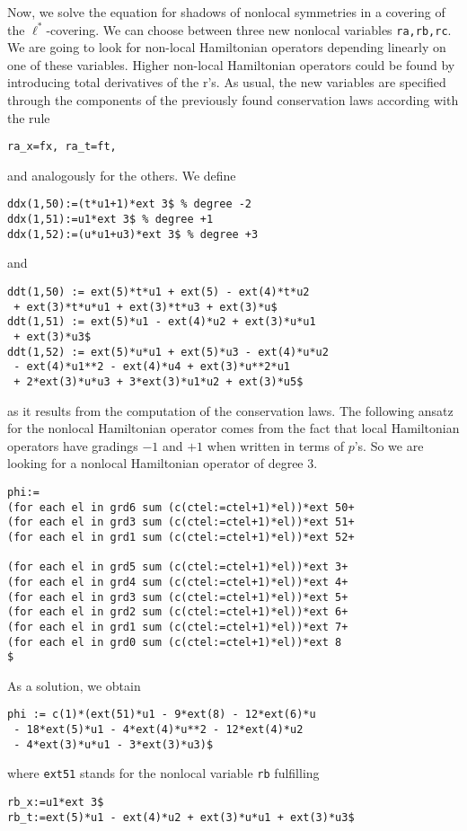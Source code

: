 Now, we solve the equation for shadows of nonlocal symmetries in a covering of
the $\ell^*$-covering. We can choose between three new nonlocal variables
\texttt{ra,rb,rc}. We are going to look for non-local Hamiltonian operators
depending linearly on one of these variables. Higher non-local Hamiltonian 
operators could be found by introducing total derivatives of the r's.
As usual, the new variables are specified through the components of the 
previously found conservation laws according with the rule
\begin{verbatim}
ra_x=fx, ra_t=ft,
\end{verbatim}
and analogously for the others. We define
\begin{verbatim}
ddx(1,50):=(t*u1+1)*ext 3$ % degree -2
ddx(1,51):=u1*ext 3$ % degree +1
ddx(1,52):=(u*u1+u3)*ext 3$ % degree +3
\end{verbatim}
and
\begin{verbatim}
ddt(1,50) := ext(5)*t*u1 + ext(5) - ext(4)*t*u2
 + ext(3)*t*u*u1 + ext(3)*t*u3 + ext(3)*u$
ddt(1,51) := ext(5)*u1 - ext(4)*u2 + ext(3)*u*u1
 + ext(3)*u3$
ddt(1,52) := ext(5)*u*u1 + ext(5)*u3 - ext(4)*u*u2
 - ext(4)*u1**2 - ext(4)*u4 + ext(3)*u**2*u1
 + 2*ext(3)*u*u3 + 3*ext(3)*u1*u2 + ext(3)*u5$
\end{verbatim}
as it results from the computation of the conservation laws.
The following ansatz for the nonlocal Hamiltonian operator
comes from the fact that local Hamiltonian operators have 
gradings $-1$ and $+1$ when written in terms of $p$'s. So we are looking 
for a nonlocal Hamiltonian operator of degree $3$.
\begin{verbatim}
phi:=
(for each el in grd6 sum (c(ctel:=ctel+1)*el))*ext 50+
(for each el in grd3 sum (c(ctel:=ctel+1)*el))*ext 51+
(for each el in grd1 sum (c(ctel:=ctel+1)*el))*ext 52+

(for each el in grd5 sum (c(ctel:=ctel+1)*el))*ext 3+
(for each el in grd4 sum (c(ctel:=ctel+1)*el))*ext 4+
(for each el in grd3 sum (c(ctel:=ctel+1)*el))*ext 5+
(for each el in grd2 sum (c(ctel:=ctel+1)*el))*ext 6+
(for each el in grd1 sum (c(ctel:=ctel+1)*el))*ext 7+
(for each el in grd0 sum (c(ctel:=ctel+1)*el))*ext 8
$
\end{verbatim}
As a solution, we obtain
\begin{verbatim}
phi := c(1)*(ext(51)*u1 - 9*ext(8) - 12*ext(6)*u
 - 18*ext(5)*u1 - 4*ext(4)*u**2 - 12*ext(4)*u2
 - 4*ext(3)*u*u1 - 3*ext(3)*u3)$
\end{verbatim}
where \texttt{ext51} stands for the nonlocal variable \texttt{rb} fulfilling
\begin{verbatim}
rb_x:=u1*ext 3$
rb_t:=ext(5)*u1 - ext(4)*u2 + ext(3)*u*u1 + ext(3)*u3$
\end{verbatim}

